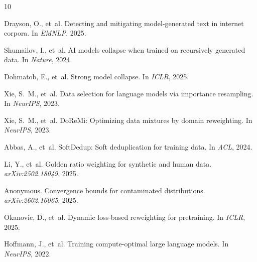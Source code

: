 \documentclass[11pt]{article}
\begin{document}
\begin{thebibliography}{10}

Drayson, O., et~al.
\newblock Detecting and mitigating model-generated text in internet corpora.
\newblock In \emph{EMNLP}, 2025.

Shumailov, I., et~al.
\newblock AI models collapse when trained on recursively generated data.
\newblock In \emph{Nature}, 2024.

Dohmatob, E., et~al.
\newblock Strong model collapse.
\newblock In \emph{ICLR}, 2025.

Xie, S.~M., et~al.
\newblock Data selection for language models via importance resampling.
\newblock In \emph{NeurIPS}, 2023.

Xie, S.~M., et~al.
\newblock DoReMi: Optimizing data mixtures by domain reweighting.
\newblock In \emph{NeurIPS}, 2023.

Abbas, A., et~al.
\newblock SoftDedup: Soft deduplication for training data.
\newblock In \emph{ACL}, 2024.

Li, Y., et~al.
\newblock Golden ratio weighting for synthetic and human data.
\newblock \emph{arXiv:2502.18049}, 2025.

Anonymous.
\newblock Convergence bounds for contaminated distributions.
\newblock \emph{arXiv:2602.16065}, 2025.

Okanovic, D., et~al.
\newblock Dynamic loss-based reweighting for pretraining.
\newblock In \emph{ICLR}, 2025.

Hoffmann, J., et~al.
\newblock Training compute-optimal large language models.
\newblock In \emph{NeurIPS}, 2022.

\end{thebibliography}
\end{document}
